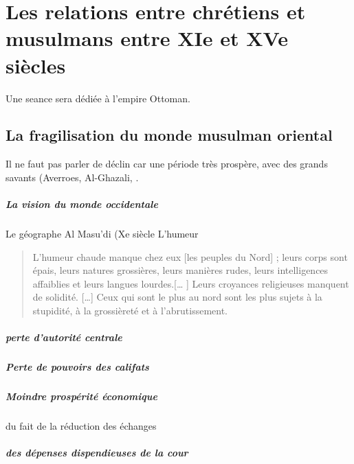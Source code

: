 \chapter{Les relations entre chrétiens et musulmans
entre XIe et XVe siècles}



Une seance sera dédiée à l'empire Ottoman.

\section{La fragilisation du monde musulman oriental}


 Il ne faut pas parler de déclin car une période très prospère, avec des grands savants (Averroes, Al-Ghazali, .

 \paragraph{La vision du monde occidentale} Le géographe
Al Masu’di (Xe siècle
L’humeur
\begin{quote}
    L’humeur chaude
manque chez eux [les peuples du Nord] ; leurs
corps sont épais, leurs natures grossières, leurs manières rudes,
leurs intelligences affaiblies et leurs langues lourdes.[… ] Leurs
croyances religieuses manquent de solidité. […] Ceux qui sont le
plus au nord sont les plus sujets à la stupidité, à la grossièreté et
à l’abrutissement.
\end{quote}

\paragraph{perte d'autorité centrale}

\paragraph{Perte de pouvoirs des califats}

\paragraph{Moindre prospérité économique} du fait de la réduction des échanges

\paragraph{des dépenses dispendieuses de la cour}

